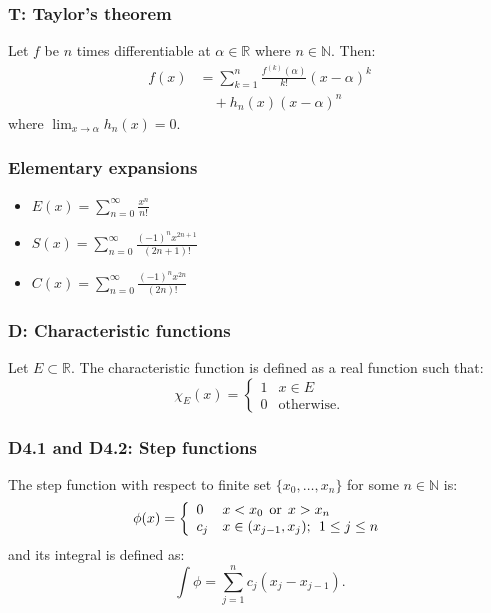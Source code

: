 \documentclass{article}
\begin{document}
\begin{multicols*}{3}
\subsubsection*{T: Taylor's theorem}
Let $f$ be $n$ times differentiable at $\alpha\in\mathbb{R}$
where $n\in\mathbb{N}$. Then:
\begin{align*}f(x)&=\sum_{k=1}^{n}\frac{f^{(k)}(\alpha)}{k!}
(x-\alpha)^k \\ &\quad+h_n(x)(x-\alpha)^n\end{align*}
where $\displaystyle\lim_{x\rightarrow\alpha}h_n(x)=0$.

\subsubsection*{Elementary expansions}
\begin{itemize}
    \item $\displaystyle E(x)
    =\sum_{n=0}^{\infty}\frac{x^n}{n!}$

    \item $\displaystyle S(x)
    =\sum_{n=0}^{\infty}\frac{(-1)^n x^{2n+1}}{(2n+1)!}$

    \item $\displaystyle C(x)
    =\sum_{n=0}^{\infty}\frac{(-1)^n x^{2n}}{(2n)!}$
\end{itemize}

\subsubsection*{D: Characteristic functions}
Let $E\subset\mathbb{R}$.
The characteristic function is defined as
a real function such that:
$$\chi_E(x) =
    \left\{
    \begin{array}{ll}
        1  & \mbox{} x \in E \\
        0 & \mbox{otherwise.}
    \end{array}
\right.$$

\subsubsection*{D4.1 and D4.2: Step functions}
The step function with respect to
finite set $\{x_0, \dots, x_n\}$
for some $n \in \mathbb{N}$ is:
$$\phi(x) =
    \left\{
    \begin{array}{ll}
	0  &  x < x_0 \hspace{0.06in} \text{or} \hspace{0.06in} x > x_n \\
	c_j & x \in (x_{j-1}, x_j); \hspace{0.06in} 1 \leq j \leq n
    \end{array}
\right.$$
and its integral is defined as:
$$\int\phi=\sum_{j=1}^{n}c_j(x_j-x_{j-1}).$$


\end{multicols*}
\end{document}

